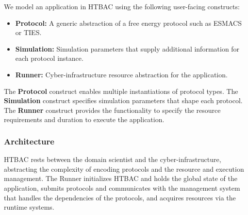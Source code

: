 We model an application in HTBAC using the following user-facing 
constructs:

\begin{itemize}
  \item \textbf{Protocol:} A generic abstraction of a free energy protocol
  such as ESMACS or TIES.
  \item \textbf{Simulation:} Simulation parameters that supply additional
  information for each protocol instance.
  \item \textbf{Runner:} Cyber-infrastructure resource abstraction for the
  application.
\end{itemize}

The \textbf{Protocol} construct  enables multiple instantiations of protocol types. 
The \textbf{Simulation} construct  specifies simulation parameters that shape 
each protocol. The \textbf{Runner} construct provides the functionality to 
specify the resource requirements and duration to execute the application.

\subsubsection{Architecture}

HTBAC rests between the domain scientist and the cyber-infrastructure, 
abstracting the complexity of encoding protocols and the resource and 
execution management. The Runner initializes HTBAC and holds the global state of 
the application, submits protocols and communicates with the management system 
that handles the dependencies of the protocols, and acquires resources via the 
runtime systems. 









